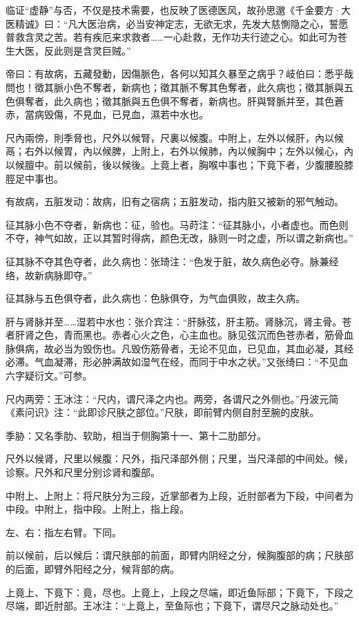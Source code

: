 \documentclass[12pt]{ctexbook}
\begin{document}
临证“虚静”与否，不仅是技术需要，也反映了医德医风，故孙思邈《千金要方·大医精诚》曰：“凡大医治病，必当安神定志，无欲无求，先发大慈惻隐之心，誓愿普救含灵之苦。若有疾厄来求救者……一心赴救，无作功夫行迹之心。如此可为苍生大医，反此则是含灵巨贼。”


\begin{yuanwen}
帝曰：有故病，五藏發動，因傷脈色，各何以知其久暴至之病乎？岐伯曰：悉乎哉問也！徵其脈小色不奪者，新病也；徵其脈不奪其色奪者，此久病也；徵其脈與五色俱奪者，此久病也；徵其脈與五色俱不奪者，新病也。肝與腎脈并至，其色蒼赤，當病毁傷，不見血，已見血，濕若中水也。

尺內兩傍，則季脅也，尺外以候腎，尺裏以候腹。中附上，左外以候肝，內以候鬲；右外以候胃，內以候脾，上附上，右外以候肺，內以候胸中；左外以候心，內以候膻中。前以候前，後以候後。上竟上者，胸喉中事也；下竟下者，少腹腰股膝脛足中事也。
\end{yuanwen}


\begin{jiaozhu}
	\item 有故病，五脏发动：故病，旧有之宿病；五脏发动，指内脏又被新的邪气触动。
	\item 征其脉小色不夺者，新病也：征，验也。马莳注：“征其脉小，小者虚也。而色则不夺，神气如故，正以其暂时得病，颜色无改，脉则一时之虚，所以谓之新病也。”
	\item 征其脉不夺其色夺者，此久病也：张琦注：“色发于脏，故久病色必夺。脉兼经络，故新病脉即夺。”
	\item 征其脉与五色俱夺者，此久病也：色脉俱夺，为气血俱败，故主久病。
	\item 肝与肾脉并至……湿若中水也：张介宾注：“肝脉弦，肝主筋。肾脉沉，肾主骨。苍者肝肾之色，青而黑也。赤者心火之色，心主血也。脉见弦沉而色苍赤者，筋骨血脉俱病，故必当为毁伤也。凡毁伤筋骨者，无论不见血，已见血，其血必凝，其经必滞。气血凝滞，形必肿满故如湿气在经，而同于中水之状。”又张绮曰：“不见血六字疑衍文。”可参。
	\item 尺内两旁：王冰注：“尺内，谓尺泽之内也。两旁，各谓尺之外侧也。”丹波元简《素问识》注：“此即诊尺肤之部位。”尺肤，即前臂内侧自肘至腕的皮肤。
	\item 季胁：又名季肋、软助，相当于侧胸第十一、第十二肋部分。
	\item 尺外以候肾，尺里以候腹：尺外，指尺泽部外侧；尺里，当尺泽部的中间处。候，诊察。尺外和尺里分别诊肾和腹部。
	\item 中附上、上附上：将尺肤分为三段，近掌部者为上段，近肘部者为下段，中间者为中段。中附上，指中段。上附上，指上段。
	\item 左、右：指左右臂。下同。
	\item 前以候前，后以候后：谓尺肤部的前面，即臂内阴经之分，候胸腹部的病；尺肤部的后面，即臂外阳经之分，候背部的病。
	\item 上竟上、下竟下：竟，尽也。上竟上，上段之尽端，即近鱼际部；下竟下，下段之尽端，即近肘部。王冰注：“上竟上，至鱼际也；下竟下，谓尽尺之脉动处也。”
\end{jiaozhu}
\end{document}
